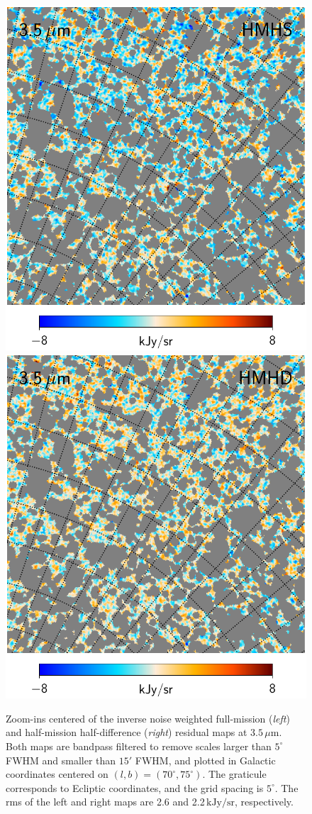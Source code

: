 \documentclass{aa}
\begin{document}
\begin{figure}
  \centering
  \includegraphics[width=0.45\linewidth]{figs/CGDR2_03_hmhs_filter_15arc_5deg.pdf}\hspace*{0mm}
  \includegraphics[width=0.45\linewidth]{figs/CGDR2_03_hmhd_filter_15arc_5deg.pdf}
  \caption{Zoom-ins centered of the inverse noise weighted full-mission (\emph{left}) and half-mission half-difference (\emph{right}) residual maps at $3.5\,\mu\mathrm{m}$. Both maps are bandpass filtered to remove scales larger than $5^{\circ}$ FWHM and smaller than $15'$ FWHM, and plotted in Galactic coordinates centered on $(l,b)=(70^{\circ},75^{\circ})$. The graticule corresponds to Ecliptic coordinates, and the grid spacing is $5^{\circ}$. The rms of the left and right maps are 2.6 and 2.2\,$\mathrm{kJy}/\mathrm{sr}$, respectively. }
  \label{fig:hmhs_zoom_fluct}
\end{figure}
\end{document}
